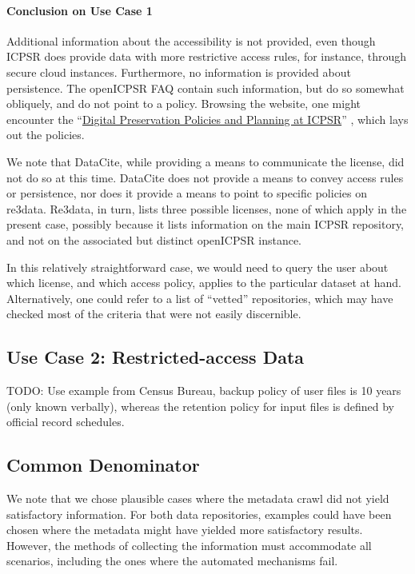 \paragraph{Conclusion on Use Case 1}
Additional information about the accessibility is not provided, even though ICPSR does provide data with more restrictive access rules, for instance, through secure cloud instances. Furthermore, no information is provided  about persistence. The openICPSR FAQ contain such information, but do so somewhat obliquely, and do not point to a policy. Browsing the website, one might encounter the ``\href{https://www.icpsr.umich.edu/icpsrweb/content/datamanagement/preservation/policies/index.html}{Digital Preservation Policies and Planning at ICPSR}'' \parencite{icpsr-preservation}, which  lays out the policies. 

We note that DataCite, while providing a means to communicate the license, did not do so at this time. DataCite does not provide a means to convey access rules or persistence, nor does it provide a means to point to specific policies on re3data. Re3data, in turn, lists three possible licenses, none of which apply in the present case, possibly because it lists information on the main ICPSR repository, and not on the associated but distinct openICPSR instance.

In this relatively straightforward case, we would need to query the user  about which license, and which access policy, applies to the particular dataset at hand. Alternatively, one could refer to a  list of ``vetted'' repositories, which may have checked most of the criteria that were not easily discernible. 

\subsection{Use Case 2: Restricted-access Data}

TODO: Use example from Census Bureau, backup policy of user files is 10 years (only known verbally), whereas the retention policy for input files is defined by official record schedules.

\subsection{Common Denominator}
We note that we chose plausible cases where the metadata crawl did not yield satisfactory information. For both data repositories, examples could have been chosen where the metadata might have yielded more satisfactory results. However, the methods of collecting the information must accommodate all scenarios, including the ones where the automated mechanisms fail.

